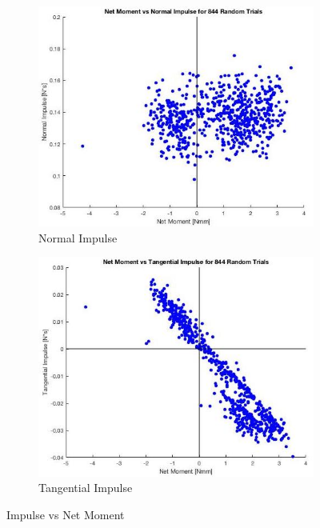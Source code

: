 \documentclass{article}
\begin{document}
\begin{figure}[ht]
  \begin{subfigure}[b]{0.4\linewidth}
    \includegraphics[scale=0.35]{netMomentvsNormImpulse.jpg}
    \caption{Normal Impulse}
    \label{fig:normImpulse}
  \end{subfigure}
  \hfill
  \begin{subfigure}[b]{0.4\linewidth}
    \includegraphics[scale=0.35]{netMomentvsTanImpulse.jpg}
    \caption{Tangential Impulse}
    \label{fig:tanImpulse2}
  \end{subfigure}
  \caption{Impulse vs Net Moment}
\end{figure}
\end{document}

